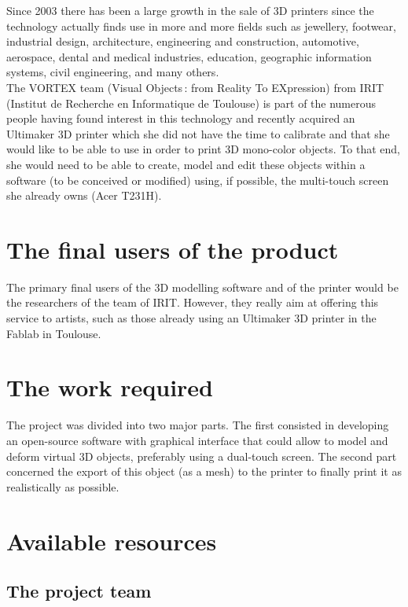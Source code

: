 \documentclass{report}
\begin{document}
	Since 2003 there has been a large growth in the sale of 3D printers since the technology actually finds use in more and more fields such as jewellery, footwear, industrial design, architecture, engineering and construction, automotive, aerospace, dental and medical industries, education, geographic information systems, civil engineering, and many others.\\

	The VORTEX team (Visual Objects : from Reality To EXpression) from IRIT (Institut de Recherche en Informatique de Toulouse) is part of the numerous people having found interest in this technology and recently acquired an Ultimaker 3D printer which she did not have the time to calibrate and that she would like to be able to use in order to print 3D mono-color objects. To that end, she would need to be able to create, model and edit these objects within a software (to be conceived or modified) using, if possible, the multi-touch screen she already owns (Acer T231H).\\

\section{The final users of the product}

	The primary final users of the 3D modelling software and of the printer would be the researchers of the team of IRIT. However, they really aim at offering this service to artists, such as those already using an Ultimaker 3D printer in the Fablab in Toulouse.

\section{The work required}

	The project was divided into two major parts. The first consisted in developing an open-source software with graphical interface that could allow to model and deform virtual 3D objects, preferably using a dual-touch screen. The second part concerned the export of this object (as a mesh) to the printer to finally print it as realistically as possible.

\section{Available resources}

\subsection{The project team}
\end{document}
